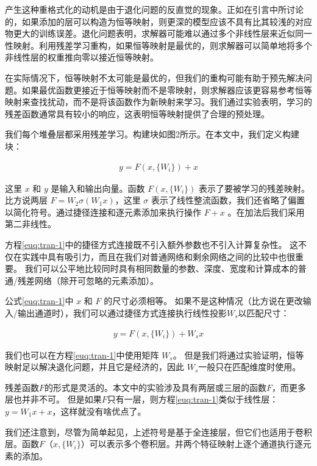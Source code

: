 产生这种重格式化的动机是由于退化问题的反直觉的现象。正如在引言中所讨论的，如果添加的层可以构造为恒等映射，则更深的模型应该不具有比其较浅的对应物更大的训练误差。退化问题表明，求解器可能难以通过多个非线性层来近似同一性映射。利用残差学习重构，如果恒等映射是最优的，则求解器可以简单地将多个非线性层的权重推向零以接近恒等映射。

在实际情况下，恒等映射不太可能是最优的，但我们的重构可能有助于预先解决问题。如果最优函数更接近于恒等映射而不是零映射，则求解器应该更容易参考恒等映射来查找扰动，而不是将该函数作为新映射来学习。我们通过实验表明，学习的残差函数通常具有较小的响应，这表明恒等映射提供了合理的预处理。


我们每个堆叠层都采用残差学习。构建块如图2所示。在本文中，我们定义构建块：

\begin{eqnarray}
    y = F(x,\{W_i\})+x
    \label{euq:tran-1}
\end{eqnarray}

这里 $ x $ 和 $ y $ 是输入和输出向量。函数 $ F(x,\{W_i\}) $ 表示了要被学习的残差映射。比方说两层 $ F = W_2 \sigma ( W_1 x) $，这里 $ \sigma $ 表示了线性整流函数，我们还省略了偏置以简化符号。通过捷径连接和逐元素添加来执行操作 $ F+x $ 。在加法后我们采用第二非线性。

方程\ref{euq:tran-1}中的捷径方式连接既不引入额外参数也不引入计算复杂性。 这不仅在实践中具有吸引力，而且在我们对普通网络和剩余网络之间的比较中也很重要。 我们可以公平地比较同时具有相同数量的参数、深度、宽度和计算成本的普通/残差网络（除开可忽略的元素添加）。

公式\ref{euq:tran-1}中 $ x $ 和 $ F $ 的尺寸必须相等。 如果不是这种情况（比方说在更改输入/输出通道时），我们可以通过捷径方式连接执行线性投影$ W_s $以匹配尺寸：

\begin{eqnarray}
    y = F(x,\{W_i\}) + W_s x
    \label{euq:tran-2}
\end{eqnarray}

我们也可以在方程\ref{euq:tran-1}中使用矩阵 $W_s$。 但是我们将通过实验证明，恒等映射足以解决退化问题，并且它是经济的，因此 $W_s$一般只在匹配维度时使用。

残差函数$F$的形式是灵活的。本文中的实验涉及具有两层或三层的函数$F$，而更多层也并非不可。 但是如果$F$只有一层，则方程\ref{euq:tran-1}类似于线性层：$y = W_1x + x$，这样就没有啥优点了。

我们还注意到，尽管为简单起见，上述符号是基于全连接层，但它们也适用于卷积层。函数$F（x,\{W_i\}）$可以表示多个卷积层。并两个特征映射上逐个通道执行逐元素的添加。

